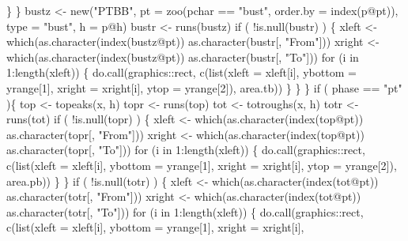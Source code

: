 \documentclass[a4paper]{article}
\begin{document}
                    \}
                \}
                bustz <- new("PTBB",
                             pt = zoo(pchar == "bust",
                                      order.by = index(p@pt)),
                              type = "bust",
                             h = p@h)
                bustr <- runs(bustz)
                if ( !is.null(bustr) ) \{
                    xleft <- which(as.character(index(bustz@pt)) %
                                   as.character(bustr[, "From"]))
                    xright <- which(as.character(index(bustz@pt)) %
                                    as.character(bustr[, "To"]))
                    for (i in 1:length(xleft)) \{
                        do.call(graphics::rect, c(list(xleft = xleft[i],
                                                       ybottom = yrange[1],
                                                       xright = xright[i],
                                                       ytop = yrange[2]),
                                                  area.tb))
                    \}
                \}
            \}
            if ( phase == "pt" )\{
                top <- topeaks(x, h)
                topr <- runs(top)
                tot <- totroughs(x, h)
                totr <- runs(tot)
                if ( !is.null(topr) ) \{
                    xleft <- which(as.character(index(top@pt)) %
                                   as.character(topr[, "From"]))
                    xright <- which(as.character(index(top@pt)) %
                                    as.character(topr[, "To"]))
                    for (i in 1:length(xleft)) \{
                        do.call(graphics::rect, c(list(xleft = xleft[i],
                                                       ybottom = yrange[1],
                                                       xright = xright[i],
                                                       ytop = yrange[2]),
                                                  area.pb))
                    \}
                \}
                if ( !is.null(totr) ) \{
                    xleft <- which(as.character(index(tot@pt)) %
                                   as.character(totr[, "From"]))
                    xright <- which(as.character(index(tot@pt)) %
                                    as.character(totr[, "To"]))
                    for (i in 1:length(xleft)) \{
                        do.call(graphics::rect, c(list(xleft = xleft[i],
                                                       ybottom = yrange[1],
                                                       xright = xright[i],
\end{document}
